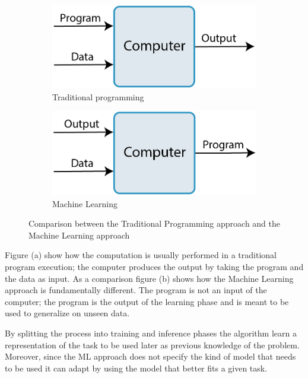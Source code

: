 \documentclass[../main.tex]{subfiles}
\begin{document}
\begin{figure}[h!]
    \centering
    \begin{subfigure}[]{0.4\textwidth}
        \includegraphics[width=\textwidth]{images/ML1.png}
        \caption{Traditional programming}
    \end{subfigure}
    \hspace{.1\linewidth}
    \begin{subfigure}[]{0.4\textwidth}
        \includegraphics[width=\textwidth]{images/ML2.png}
        \caption{Machine Learning}
        \label{fig:ML2}
    \end{subfigure}
    \caption{ Comparison between the Traditional Programming approach and the Machine Learning approach}
    \label{fig:ML}
\end{figure}

Figure (a) show how the computation is usually performed in a traditional program execution; the computer produces the output by taking the program and the data as input. As a comparison figure (b) shows how the Machine Learning approach is fundamentally different. The program is not an input of the computer; the program is the output of the learning phase and is meant to be used to generalize on unseen data.

By splitting the process into training and inference phases the algorithm learn a representation of the task to be used later as previous knowledge of the problem. 
Moreover, since the ML approach does not specify the kind of model that needs to be used it can adapt by using the model that better fits a given task.
\end{document}
